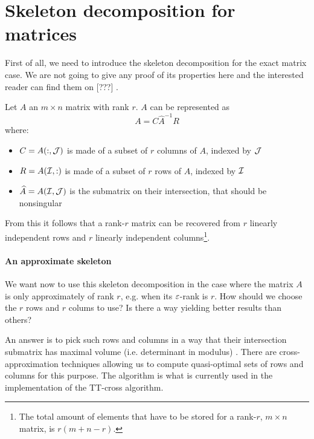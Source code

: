 \section{Skeleton decomposition for matrices}
First of all, we need to introduce the skeleton decomposition for the exact matrix case. We are not going to give any proof of its properties here and the interested reader can find them on [???] .

\begin{Teo}
  Let $A$ an $m \times n$ matrix with rank $r$. $A$ can be represented as
  \begin{equation} \label{def:skeleton}
    A = C \hat{A}^{-1} R
  \end{equation}
  where:
  \begin{itemize}
  \item $C = A(:,\mathcal{J})$ is made of a subset of $r$ columns of $A$, indexed by $\mathcal{J}$
  \item $R = A(\mathcal{I},:)$ is made of a subset of $r$ rows of $A$, indexed by $\mathcal{I}$
  \item $\widehat{A} = A(\mathcal{I},\mathcal{J})$ is the submatrix on their intersection, that should be nonsingular
  \end{itemize}
\end{Teo}

From this it follows that a rank-$r$ matrix can be recovered from $r$ linearly independent rows and $r$ linearly independent columns\footnote{The total amount of elements that have to be stored for a rank-$r$, $m \times n$ matrix, is $r(m+n-r)$.}.

\paragraph{An approximate skeleton}
We want now to use this skeleton decomposition in the case where the matrix $A$ is only approximately of rank $r$, e.g. when its $\varepsilon$-rank is $r$.
How should we choose the $r$ rows and $r$ colums to use? Is there a way yielding better results than others?

An answer is to pick such rows and columns in a way that their intersection submatrix has maximal volume (i.e. determinant in modulus) . There are cross-approximation techniques allowing us to compute quasi-optimal sets of rows and columns for this purpose. The   algorithm is what is currently used in the implementation of the TT-cross algorithm.

